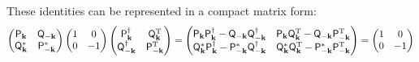 \documentclass[aps, prx, nofootinbib, superscriptaddress]{revtex4-2}
\begin{document}
These identities can be represented in a compact matrix form:
\begin{equation}
    \begin{pmatrix}
       \mathsf{P}_{\mathbf{k}} & \mathsf{Q}_{-\mathbf{k}} \\ 
       \mathsf{Q}_{\mathbf{k}}^{*} & \mathsf{P}_{-\mathbf{k}}^{*}
    \end{pmatrix}
    \begin{pmatrix}
        1 & 0 \\ 0 & -1
    \end{pmatrix}
    \begin{pmatrix}
       \mathsf{P}_{\mathbf{k}}^{\dagger} & \mathsf{Q}_{\mathbf{k}}^{\rm T} \\ 
       \mathsf{Q}_{-\mathbf{k}}^{\dagger} & \mathsf{P}_{-\mathbf{k}}^{\rm T}
    \end{pmatrix} 
    = 
    \begin{pmatrix} 
        \mathsf{P}_{\mathbf{k}}\mathsf{P}_{\mathbf{k}}^{\dagger} - \mathsf{Q}_{-\mathbf{k}}\mathsf{Q}_{-\mathbf{k}}^{\dagger} & 
        \mathsf{P}_{\mathbf{k}}\mathsf{Q}_{\mathbf{k}}^{\rm T}   - \mathsf{Q}_{-\mathbf{k}}\mathsf{P}_{-\mathbf{k}}^{\rm T}     \\
        \mathsf{Q}_{\mathbf{k}}^{*}\mathsf{P}_{\mathbf{k}}^{\dagger} - \mathsf{P}_{-\mathbf{k}}^{*}\mathsf{Q}_{-\mathbf{k}}^{\dagger} & 
            \mathsf{Q}_{\mathbf{k}}^{*}\mathsf{Q}_{\mathbf{k}}^{\rm T} - \mathsf{P}_{-\mathbf{k}}^{*}\mathsf{P}_{-\mathbf{k}}^{\rm T}
    \end{pmatrix}
    = 
    \begin{pmatrix}
        1 & 0 \\ 0 & -1
    \end{pmatrix}
\end{equation}
\end{document}
